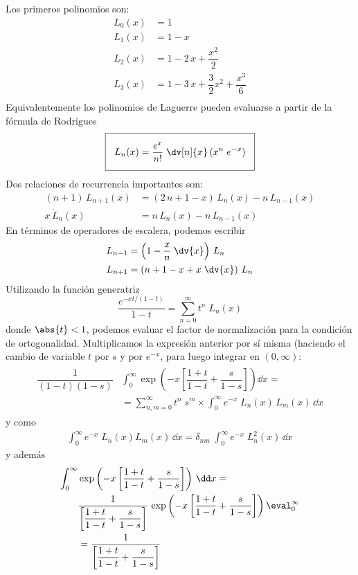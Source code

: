 Los primeros polinomios son:
\begin{align*}
L_{0} (x) &= 1 \\
L_{1} (x) &= 1 - x \\
L_{2} (x) &= 1 - 2 \, x + \dfrac{x^{2}}{2} \\
L_{3} (x) &= 1 - 3 \, x + \dfrac{3}{2} x^{2} + \dfrac{x^{3}}{6} \\
\end{align*}
Equivalentemente los polinomios de Laguerre pueden evaluarse a partir de la fórmula de Rodrigues
\begin{align*}
\setlength{\fboxsep}{3\fboxsep}\boxed{ L_{n}(x) = \dfrac{e^{x}}{n!} \; \dv[n]{x} \, (x^{n} \; e^{-x}) }
\end{align*}
Dos relaciones de recurrencia importantes son:
\begin{align*}
(n + 1) \, L_{n + 1}(x) &= (2 \, n + 1 - x) \, L_{n}(x) - n \, L_{n-1}(x) \\
x \, \dot{L}_{n}(x) &= n \, L_{n}(x) - n \, L_{n - 1}(x)
\end{align*}
En términos de operadores de escalera, podemos escribir
\begin{align*}
L_{n - 1} &= \left( 1 - \dfrac{x}{n} \; \dv{x} \right) \, L_{n} \\
L_{n + 1} &= \left( n + 1 - x + x \; \dv{x} \right) \, L_{n}
\end{align*}
Utilizando la función generatriz
\[ \dfrac{e^{-x t/(1 - t)}}{1 - t} = \sum_{n=0}^{\infty} t^{n} \; L_{n}(x) \]
donde $\abs{t} < 1$, podemos evaluar el factor de normalización para la condición de ortogonalidad. Multiplicamos la expresión anterior por sí misma (haciendo el cambio de variable $t$ por $s$ y por $e^{-x}$, para luego integrar en $(0, \infty)$:
\begin{align}
\begin{aligned}
\dfrac{1}{(1 - t)(1 - s)} &\int_{0}^{\infty} \exp \left( -x \left[ \dfrac{1+t}{1-t} + \dfrac{s}{1-s} \right] \right) \dd{x} =  \\
&= \sum_{n, m = 0}^{\infty} t^{n} \; s^{m} \times \int_{0}^{\infty} e^{-x} \; L_{n}(x) \, L_{m}(x) \, \dd{x}
\end{aligned}
\label{eq:ecuacion_08_77}
\end{align}
y como
\begin{align*}
\int_{0}^{\infty} e^{-x} \; L_{n}(x) L_{m}(x) \, \dd x = \delta_{nm} \; \int_{0}^{\infty} e^{-x} \; L_{n}^{2} (x) \, \dd{x}
\end{align*}
y además
\begin{align*}
\int_{0}^{\infty} &\exp \left( -x \left[ \dfrac{1 + t}{1 - t} + \dfrac{s}{1 - s} \right] \right) \, \dd x = \\
&\dfrac{1}{\left[ \dfrac{1 + t}{1 - t} + \dfrac{s}{1 - s} \right]} \, \exp \left( -x \left[ \dfrac{1 + t}{1 - t} + \dfrac{s}{1 - s} \right] \right) \eval_{0}^{\infty} \\
&= \dfrac{1}{\left[ \dfrac{1 + t}{1 - t} + \dfrac{s}{1 - s} \right]}
\end{align*}
